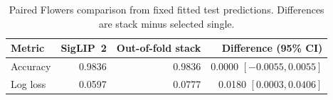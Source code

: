 \begin{table}[!htbp]
\centering\small
\caption{Paired Flowers comparison from fixed fitted test predictions. Differences are stack minus selected single.}
\label{tab:flowers-uncertainty}
\begin{tabular}{lrrr}
\toprule
Metric & SigLIP~2 & Out-of-fold stack & Difference (95\% CI)\\
\midrule
Accuracy & 0.9836 & 0.9836 & 0.0000 $[-0.0055,0.0055]$\\
Log loss & 0.0597 & 0.0777 & 0.0180 $[0.0003,0.0406]$\\
\bottomrule
\end{tabular}
\end{table}
